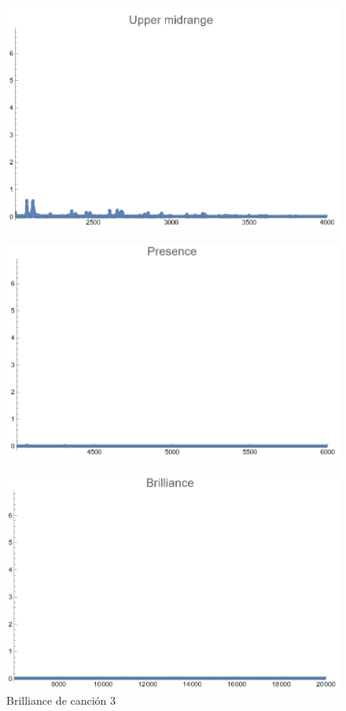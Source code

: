 \documentclass[12pt, letterpaper]{article}
\begin{document}
\begin{figure}[H]
  \centering
  \begin{minipage}{.5\textwidth}
    \centering
    \includegraphics[width=.9\linewidth]{imgs/Cancion3/upmid.png}
    \label{fig:03f}
  \end{minipage}%
  \begin{minipage}{.5\textwidth}
    \centering
    \includegraphics[width=.9\linewidth]{imgs/Cancion3/presence.png}
    \label{fig:03g}
  \end{minipage}
\end{figure}
\begin{figure}[H]
  \centering
  \includegraphics[width=.45\linewidth]{imgs/Cancion3/brilliance.png}
  \caption{Brilliance de canción 3}
  \label{fig:03h}
\end{figure}
\end{document}
